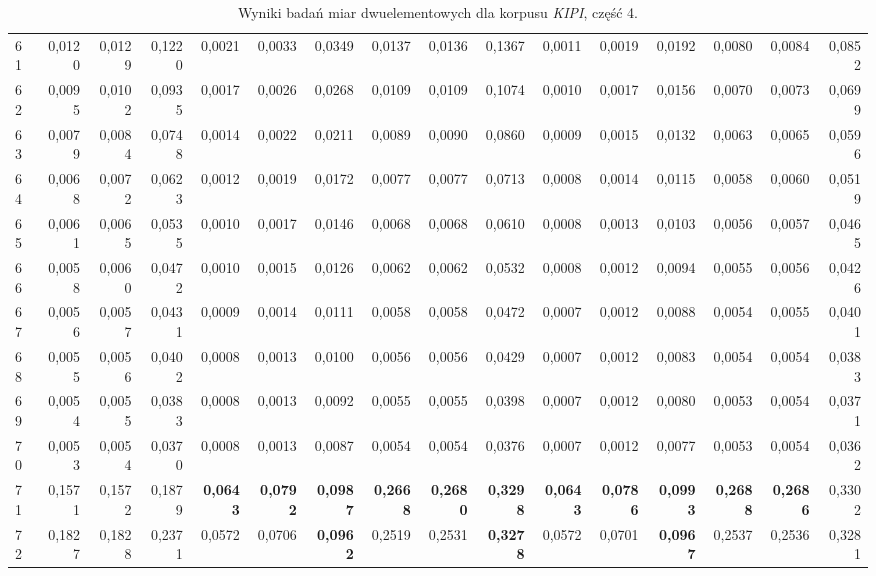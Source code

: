 \begin{table}[htp!]
\begin{adjustwidth}{-2cm}{}
\begin{tabular}{ l | *{15}{| r}}
61	&	0,0120	&	0,0129	&	0,1220	&	0,0021	&	0,0033	&	0,0349	&	0,0137	&	0,0136	&	0,1367	&	0,0011	&	0,0019	&	0,0192	&	0,0080	&	0,0084	&	0,0852	\\
62	&	0,0095	&	0,0102	&	0,0935	&	0,0017	&	0,0026	&	0,0268	&	0,0109	&	0,0109	&	0,1074	&	0,0010	&	0,0017	&	0,0156	&	0,0070	&	0,0073	&	0,0699	\\
63	&	0,0079	&	0,0084	&	0,0748	&	0,0014	&	0,0022	&	0,0211	&	0,0089	&	0,0090	&	0,0860	&	0,0009	&	0,0015	&	0,0132	&	0,0063	&	0,0065	&	0,0596	\\
64	&	0,0068	&	0,0072	&	0,0623	&	0,0012	&	0,0019	&	0,0172	&	0,0077	&	0,0077	&	0,0713	&	0,0008	&	0,0014	&	0,0115	&	0,0058	&	0,0060	&	0,0519	\\
65	&	0,0061	&	0,0065	&	0,0535	&	0,0010	&	0,0017	&	0,0146	&	0,0068	&	0,0068	&	0,0610	&	0,0008	&	0,0013	&	0,0103	&	0,0056	&	0,0057	&	0,0465	\\
66	&	0,0058	&	0,0060	&	0,0472	&	0,0010	&	0,0015	&	0,0126	&	0,0062	&	0,0062	&	0,0532	&	0,0008	&	0,0012	&	0,0094	&	0,0055	&	0,0056	&	0,0426	\\
67	&	0,0056	&	0,0057	&	0,0431	&	0,0009	&	0,0014	&	0,0111	&	0,0058	&	0,0058	&	0,0472	&	0,0007	&	0,0012	&	0,0088	&	0,0054	&	0,0055	&	0,0401	\\
68	&	0,0055	&	0,0056	&	0,0402	&	0,0008	&	0,0013	&	0,0100	&	0,0056	&	0,0056	&	0,0429	&	0,0007	&	0,0012	&	0,0083	&	0,0054	&	0,0054	&	0,0383	\\
69	&	0,0054	&	0,0055	&	0,0383	&	0,0008	&	0,0013	&	0,0092	&	0,0055	&	0,0055	&	0,0398	&	0,0007	&	0,0012	&	0,0080	&	0,0053	&	0,0054	&	0,0371	\\
70	&	0,0053	&	0,0054	&	0,0370	&	0,0008	&	0,0013	&	0,0087	&	0,0054	&	0,0054	&	0,0376	&	0,0007	&	0,0012	&	0,0077	&	0,0053	&	0,0054	&	0,0362	\\
71	&	0,1571	&	0,1572	&	0,1879	&	\textbf{0,0643}	&	\textbf{0,0792}	&	\textbf{0,0987}	&	\textbf{0,2668}	&	\textbf{0,2680}	&	\textbf{0,3298}	&	\textbf{0,0643}	&	\textbf{0,0786}	&	\textbf{0,0993}	&	\textbf{0,2688}	&	\textbf{0,2686}	&	0,3302	\\
72	&	0,1827	&	0,1828	&	0,2371	&	0,0572	&	0,0706	&	\textbf{0,0962}	&	0,2519	&	0,2531	&	\textbf{0,3278}	&	0,0572	&	0,0701	&	\textbf{0,0967}	&	0,2537	&	0,2536	&	0,3281	\\
	\bottomrule
\end{tabular}
 \end{adjustwidth}
\caption[Wyniki badań miar dwuelementowych dla korpusu \emph{KIPI}, część 4]{Wyniki badań miar dwuelementowych dla korpusu \emph{KIPI}, część 4.}
\label{KIPI_part_4}
\end{table}
	
